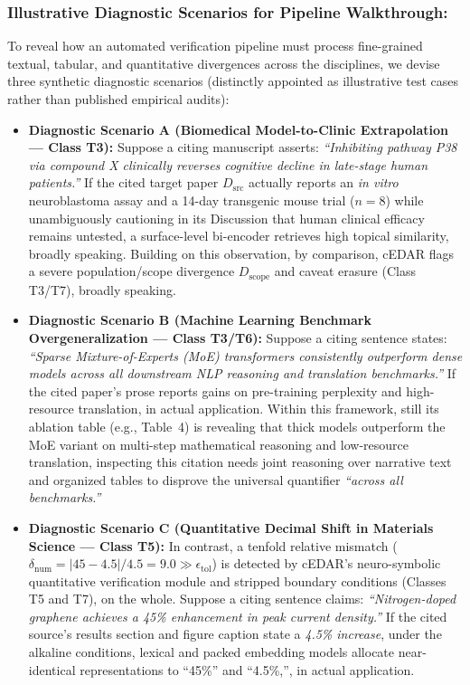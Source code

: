 \documentclass[journal]{IEEEtran}
\begin{document}
\subsubsection{Illustrative Diagnostic Scenarios for Pipeline Walkthrough:}
To reveal how an automated verification pipeline must process fine-grained textual, tabular, and quantitative divergences across the disciplines, we devise three synthetic diagnostic scenarios (distinctly appointed as illustrative test cases rather than published empirical audits):
\begin{itemize}
\item \textbf{Diagnostic Scenario A (Biomedical Model-to-Clinic Extrapolation --- Class T3):} Suppose a citing manuscript asserts: \emph{``Inhibiting pathway P38 via compound X clinically reverses cognitive decline in late-stage human patients.''} If the cited target paper $D_{\text{src}}$ actually reports an \emph{in vitro} neuroblastoma assay and a 14-day transgenic mouse trial ($n=8$) while unambiguously cautioning in its Discussion that human clinical efficacy remains untested, a surface-level bi-encoder retrieves high topical similarity, broadly speaking. Building on this observation, by comparison, cEDAR flags a severe population/scope divergence $D_{\text{scope}}$ and caveat erasure (Class T3/T7), broadly speaking.
\item \textbf{Diagnostic Scenario B (Machine Learning Benchmark Overgeneralization --- Class T3/T6):} Suppose a citing sentence states: \emph{``Sparse Mixture-of-Experts (MoE) transformers consistently outperform dense models across all downstream NLP reasoning and translation benchmarks.''} If the cited paper's prose reports gains on pre-training perplexity and high-resource translation, in actual application. Within this framework, still its ablation table (e.g., Table~4) is revealing that thick models outperform the MoE variant on multi-step mathematical reasoning and low-resource translation, inspecting this citation needs joint reasoning over narrative text and organized tables \cite{herzig2020tapas,lu2023scitab} to disprove the universal quantifier \emph{``across all benchmarks.''}
\item \textbf{Diagnostic Scenario C (Quantitative Decimal Shift in Materials Science --- Class T5):} In contrast, a tenfold relative mismatch ($\delta_{\text{num}} = |45 - 4.5|/4.5 = 9.0 \gg \epsilon_{\text{tol}}$) is detected by cEDAR's neuro-symbolic quantitative verification module and stripped boundary conditions (Classes T5 and T7), on the whole. Suppose a citing sentence claims: \emph{``Nitrogen-doped graphene achieves a 45\% enhancement in peak current density.''} If the cited source's results section and figure caption state a \emph{4.5\% increase}, under the alkaline conditions, lexical and packed embedding models allocate near-identical representations to ``45\%'' and ``4.5\%,'', in actual application.
\end{itemize}
\end{document}
